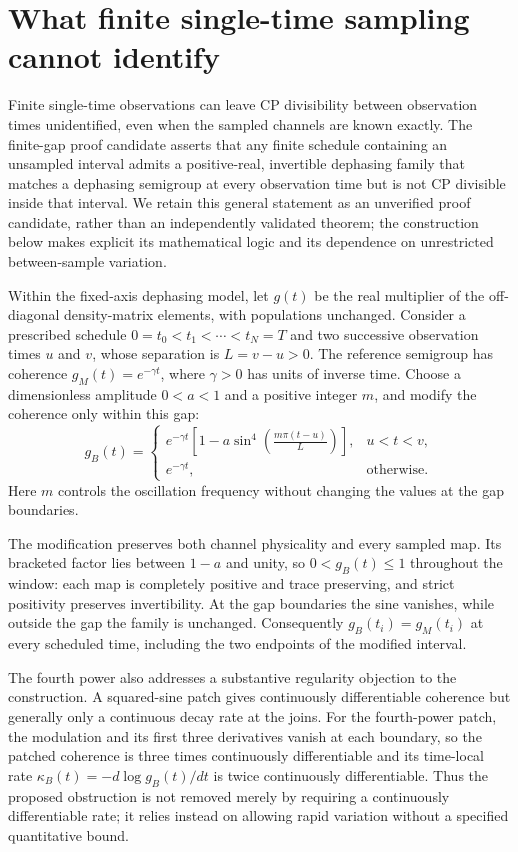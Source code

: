 \documentclass[11pt]{article}
\begin{document}
\section{What finite single-time sampling cannot identify}
Finite single-time observations can leave CP divisibility between observation times unidentified, even when the sampled channels are known exactly. The finite-gap proof candidate asserts that any finite schedule containing an unsampled interval admits a positive-real, invertible dephasing family that matches a dephasing semigroup at every observation time but is not CP divisible inside that interval. We retain this general statement as an unverified proof candidate, rather than an independently validated theorem; the construction below makes explicit its mathematical logic and its dependence on unrestricted between-sample variation.

Within the fixed-axis dephasing model, let $g(t)$ be the real multiplier of the off-diagonal density-matrix elements, with populations unchanged. Consider a prescribed schedule $0=t_0<t_1<\cdots<t_N=T$ and two successive observation times $u$ and $v$, whose separation is $L=v-u>0$. The reference semigroup has coherence $g_M(t)=e^{-\gamma t}$, where $\gamma>0$ has units of inverse time. Choose a dimensionless amplitude $0<a<1$ and a positive integer $m$, and modify the coherence only within this gap: \[g_B(t)=\begin{cases}e^{-\gamma t}\left[1-a\sin^4\!\left(\frac{m\pi(t-u)}{L}\right)\right],&u<t<v,\\e^{-\gamma t},&\text{otherwise}.\end{cases}\] Here $m$ controls the oscillation frequency without changing the values at the gap boundaries.

The modification preserves both channel physicality and every sampled map. Its bracketed factor lies between $1-a$ and unity, so $0<g_B(t)\leq1$ throughout the window: each map is completely positive and trace preserving, and strict positivity preserves invertibility. At the gap boundaries the sine vanishes, while outside the gap the family is unchanged. Consequently $g_B(t_i)=g_M(t_i)$ at every scheduled time, including the two endpoints of the modified interval.

The fourth power also addresses a substantive regularity objection to the construction. A squared-sine patch gives continuously differentiable coherence but generally only a continuous decay rate at the joins. For the fourth-power patch, the modulation and its first three derivatives vanish at each boundary, so the patched coherence is three times continuously differentiable and its time-local rate $\kappa_B(t)=-d\log g_B(t)/dt$ is twice continuously differentiable. Thus the proposed obstruction is not removed merely by requiring a continuously differentiable rate; it relies instead on allowing rapid variation without a specified quantitative bound.
\end{document}
